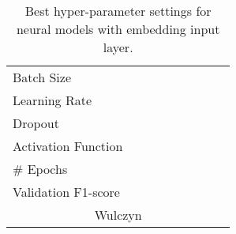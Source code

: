 \begin{landscape}
\begin{table}[]
\begin{tabular}{l|llll|llll}
Batch Size            &         &         &         &         &         &         &         &         \\
Learning Rate         &         &         &         &         &         &         &         &         \\
Dropout               &         &         &         &         &         &         &         &         \\
Activation Function   &         &         &         &         &         &         &         &         \\
# Epochs              &         &         &         &         &         &         &         &         \\
Validation F1-score   &         &         &         &         &         &         &         &         \\
  \toprule\multicolumn{9}{c}{Wulczyn}\\\toprule
\end{tabular}
\caption{Best hyper-parameter settings for neural models with embedding input layer.}
\label{tab:redux_hyperparam_search_davidson}
\end{table}
\end{landscape}


